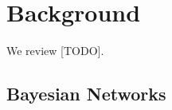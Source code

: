 \chapter{Background}
\label{sec:background}

\reversemarginpar

We review [TODO].


\section{Bayesian Networks}
\label{sec:baysian_networks}


